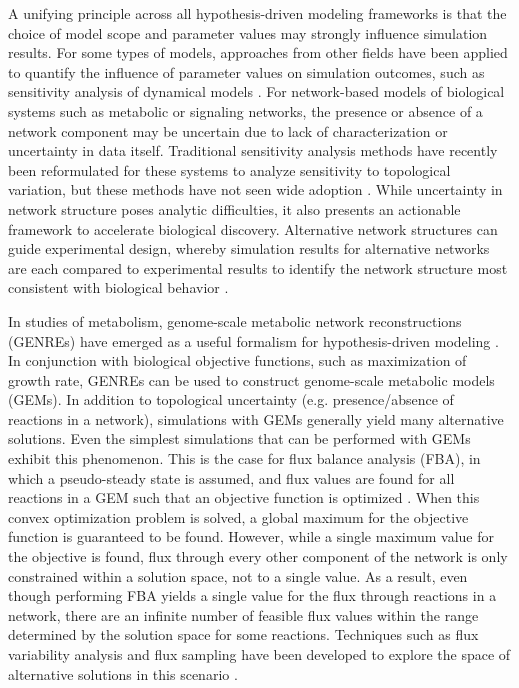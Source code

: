 \documentclass[11pt,twocolumn,notitlepage,openany,twoside]{book}
\begin{document}
\begin{refsection}
A unifying principle across all hypothesis-driven modeling frameworks is that the choice of model scope and parameter values may strongly influence simulation results. For some types of models, approaches from other fields have been applied to quantify the influence of parameter values on simulation outcomes, such as sensitivity analysis of dynamical models \cite{Marino2008-jt}. For network-based models of biological systems such as metabolic or signaling networks, the presence or absence of a network component may be uncertain due to lack of characterization or uncertainty in data itself. Traditional sensitivity analysis methods have recently been reformulated for these systems to analyze sensitivity to topological variation, but these methods have not seen wide adoption \cite{Babtie2014-vy}. While uncertainty in network structure poses analytic difficulties, it also presents an actionable framework to accelerate biological discovery. Alternative network structures can guide experimental design, whereby simulation results for alternative networks are each compared to experimental results to identify the network structure most consistent with biological behavior \cite{Medlock2018-kx,Silk2014-rv}.

In studies of metabolism, genome-scale metabolic network reconstructions (GENREs) have emerged as a useful formalism for hypothesis-driven modeling \cite{Oberhardt2009-iu}. In conjunction with biological objective functions, such as maximization of growth rate, GENREs can be used to construct genome-scale metabolic models (GEMs). In addition to topological uncertainty (e.g. presence/absence of reactions in a network), simulations with GEMs generally yield many alternative solutions. Even the simplest simulations that can be performed with GEMs exhibit this phenomenon. This is the case for flux balance analysis (FBA), in which a pseudo-steady state is assumed, and flux values are found for all reactions in a GEM such that an objective function is optimized \cite{Orth2010-kl}. When this convex optimization problem is solved, a global maximum for the objective function is guaranteed to be found. However, while a single maximum value for the objective is found, flux through every other component of the network is only constrained within a solution space, not to a single value. As a result, even though performing FBA yields a single value for the flux through reactions in a network, there are an infinite number of feasible flux values within the range determined by the solution space for some reactions. Techniques such as flux variability analysis and flux sampling have been developed to explore the space of alternative solutions in this scenario \cite{Mahadevan2003-ah,Schellenberger2009-bj}.


\end{refsection}
\end{document}
